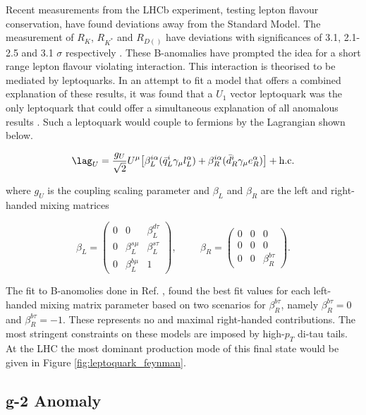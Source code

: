 Recent measurements from the LHCb experiment, testing lepton flavour conservation, have found deviations away from the Standard Model. The measurement of $R_{K}$, $R_{K^{*}}$ and $R_{D(^{})}$ have deviations with significances of 3.1, 2.1-2.5 and 3.1 $\sigma$ respectively \cite{Rk,Rkstar,Rd}. These B-anomalies have prompted the idea for a short range lepton flavour violating interaction. This interaction is theorised to be mediated by leptoquarks. In an attempt to fit a model that offers a combined explanation of these results, it was found that a $U_{1}$ vector leptoquark was the only leptoquark that could offer a simultaneous explanation of all anomalous results \cite{leptoquark}. Such a leptoquark would couple to fermions by the Lagrangian shown below.

\begin{equation}
\lag_{U} = \frac{g_{U}}{\sqrt{2}} U^{\mu} \big[ \beta_{L}^{i\alpha}( \bar{q}_{L}^{i} \gamma_{\mu} l_{L}^{\alpha}) + \beta_{R}^{i\alpha}( \bar{d}_{R}^{i} \gamma_{\mu} e_{R}^{\alpha}) \big] + \text{h.c.}
\end{equation}

where $g_{U}$ is the coupling scaling parameter and $\beta_{L}$ and $\beta_{R}$ are the left and right-handed mixing matrices

\begin{equation}
\beta_{L} = 
\begin{pmatrix}
0 & 0 & \beta_{L}^{d\tau} \\
0 & \beta_{L}^{s\mu} & \beta_{L}^{s\tau} \\
0 & \beta_{L}^{b\mu} & 1
\end{pmatrix},
\hspace{1cm}
\beta_{R} = 
\begin{pmatrix}
0 & 0 & 0 \\
0 & 0 & 0 \\
0 & 0 & \beta_{R}^{b\tau}
\end{pmatrix}.
\end{equation}

The fit to B-anomolies done in Ref. \cite{leptoquark}, found the best fit values for each left-handed mixing matrix parameter based on two scenarios for $\beta^{b\tau}_{R}$, namely $\beta^{b\tau}_{R} = 0$ and $\beta^{b\tau}_{R} = -1$. These represents no and maximal right-handed contributions. The most stringent constraints on these models are imposed by high-$p_{T}$ di-tau tails. At the LHC the most dominant production mode of this final state would be given in Figure \ref{fig:leptoquark_feynman}.

\subsection{g-2 Anomaly}


